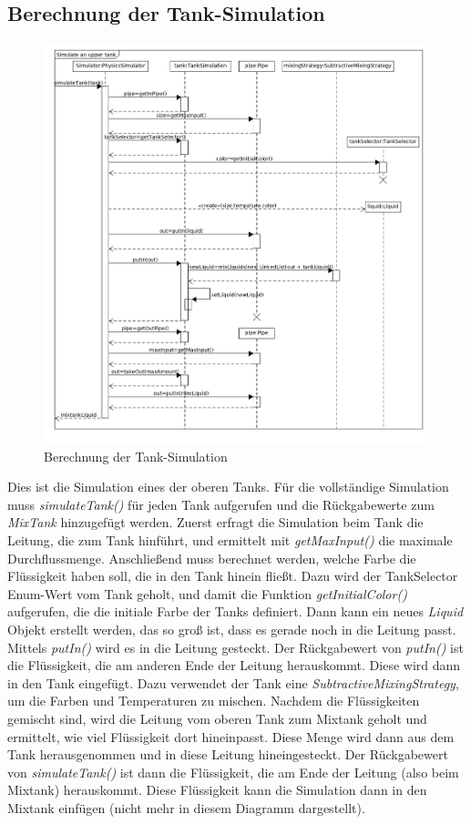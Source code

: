 \documentclass[parskip=full]{scrartcl}
\begin{document}
\subsection{Berechnung der Tank-Simulation}
\begin{figure}[H]
  \centering
  \includegraphics[scale=0.45]{design/sequence-diagrams/tank-simulation.png}
  \caption{Berechnung der Tank-Simulation}
\end{figure}
Dies ist die Simulation eines der oberen Tanks. Für die vollständige Simulation muss \emph{simulateTank()} für jeden Tank aufgerufen
und die Rückgabewerte zum \emph{MixTank} hinzugefügt werden. Zuerst erfragt die Simulation beim Tank die Leitung, die zum Tank hinführt, und ermittelt
mit \emph{getMaxInput()} die maximale Durchflussmenge. Anschließend muss berechnet werden, welche Farbe die Flüssigkeit haben soll, die in den Tank
hinein fließt. Dazu wird der TankSelector Enum-Wert vom Tank geholt, und damit die Funktion \emph{getInitialColor()} aufgerufen, die die initiale Farbe der Tanks definiert.
Dann kann ein neues \emph{Liquid} Objekt erstellt werden, das so groß ist, dass es gerade noch in die Leitung passt. Mittels \emph{putIn()} wird es
in die Leitung gesteckt. Der Rückgabewert von \emph{putIn()} ist die Flüssigkeit, die am anderen Ende der Leitung herauskommt. Diese wird dann in den
Tank eingefügt. Dazu verwendet der Tank eine \emph{SubtractiveMixingStrategy}, um die Farben und Temperaturen zu mischen. Nachdem die Flüssigkeiten
gemischt sind, wird die Leitung vom oberen Tank zum Mixtank geholt und ermittelt, wie viel Flüssigkeit dort hineinpasst. Diese Menge wird dann aus dem
Tank herausgenommen und in diese Leitung hineingesteckt. Der Rückgabewert von \emph{simulateTank()} ist dann die Flüssigkeit, die am Ende der Leitung
(also beim Mixtank) herauskommt. Diese Flüssigkeit kann die Simulation dann in den Mixtank einfügen (nicht mehr in diesem Diagramm dargestellt).
\end{document}
